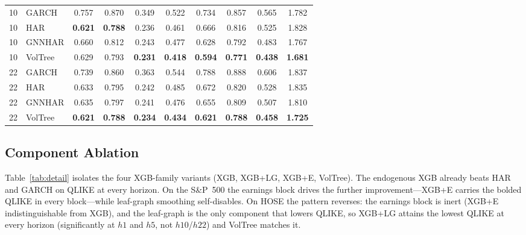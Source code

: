 \documentclass[runningheads]{llncs}
\begin{document}
\begin{table}[h!]
\begin{tabular}{ll cccc cccc}
\midrule
10 & GARCH    & 0.757 & 0.870 & 0.349 & 0.522 & 0.734 & 0.857 & 0.565 & 1.782 \\
10 & HAR      & \textbf{0.621} & \textbf{0.788} & 0.236 & 0.461 & 0.666 & 0.816 & 0.525 & 1.828 \\
10 & GNNHAR   & 0.660 & 0.812 & 0.243 & 0.477 & 0.628 & 0.792 & 0.483 & 1.767 \\
10 & VolTree & 0.629 & 0.793 & \textbf{0.231} & \textbf{0.418} & \textbf{0.594} & \textbf{0.771} & \textbf{0.438} & \textbf{1.681} \\
\midrule
22 & GARCH    & 0.739 & 0.860 & 0.363 & 0.544 & 0.788 & 0.888 & 0.606 & 1.837 \\
22 & HAR      & 0.633 & 0.795 & 0.242 & 0.485 & 0.672 & 0.820 & 0.528 & 1.835 \\
22 & GNNHAR   & 0.635 & 0.797 & 0.241 & 0.476 & 0.655 & 0.809 & 0.507 & 1.810 \\
22 & VolTree & \textbf{0.621} & \textbf{0.788} & \textbf{0.234} & \textbf{0.434} & \textbf{0.621} & \textbf{0.788} & \textbf{0.458} & \textbf{1.725} \\
\bottomrule
\end{tabular}
\end{table}

\FloatBarrier
\subsection{Component Ablation}
Table~\ref{tab:detail} isolates the four XGB-family variants (XGB, XGB+LG, XGB+E, VolTree). The endogenous
XGB already beats HAR and GARCH on QLIKE at every horizon. On the S\&P~500 the earnings block drives the
further improvement---XGB+E carries the bolded QLIKE in every block---while leaf-graph smoothing
self-disables. On HOSE the pattern reverses: the earnings block is inert (XGB+E indistinguishable from
XGB), and the leaf-graph is the only component that lowers QLIKE, so XGB+LG attains the lowest QLIKE at
every horizon (significantly at $h1$ and $h5$, not $h10$/$h22$) and VolTree matches it.
\end{document}

